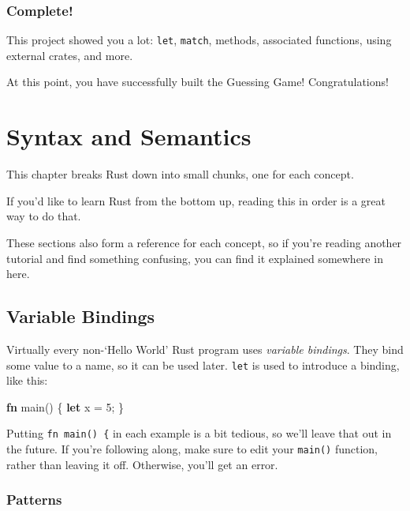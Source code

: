 \documentclass[a4paper,]{book}
\renewcommand*{\hypertarget}[3][\ar]{%
  \def\ar{#2}%
  \label{#1}%
  #3}
\newenvironment{Shaded}{\begin{snugshade}}{\end{snugshade}}
\newcommand{\KeywordTok}[1]{\textcolor[rgb]{0.13,0.29,0.53}{\textbf{{#1}}}}
\newcommand{\DecValTok}[1]{\textcolor[rgb]{0.00,0.00,0.81}{{#1}}}
\newcommand{\NormalTok}[1]{{#1}}
\begin{document}
\subsection{Complete!}\label{complete}

This project showed you a lot: \texttt{let}, \texttt{match}, methods,
associated functions, using external crates, and more.

At this point, you have successfully built the Guessing Game!
Congratulations!

\hypertarget{sec--syntax-and-semantics}{\chapter{Syntax and
Semantics}\label{sec--syntax-and-semantics}}

This chapter breaks Rust down into small chunks, one for each concept.

If you'd like to learn Rust from the bottom up, reading this in order is
a great way to do that.

These sections also form a reference for each concept, so if you're
reading another tutorial and find something confusing, you can find it
explained somewhere in here.

\hypertarget{sec--variable-bindings}{\section{Variable
Bindings}\label{sec--variable-bindings}}

Virtually every non-`Hello World' Rust program uses \emph{variable
bindings}. They bind some value to a name, so it can be used later.
\texttt{let} is used to introduce a binding, like this:

\begin{Shaded}
\begin{Highlighting}[]
\KeywordTok{fn} \NormalTok{main() \{}
    \KeywordTok{let} \NormalTok{x = }\DecValTok{5}\NormalTok{;}
\NormalTok{\}}
\end{Highlighting}
\end{Shaded}

Putting \texttt{fn\ main()\ \{} in each example is a bit tedious, so
we'll leave that out in the future. If you're following along, make sure
to edit your \texttt{main()} function, rather than leaving it off.
Otherwise, you'll get an error.

\subsection{Patterns}\label{patterns}
\end{document}
